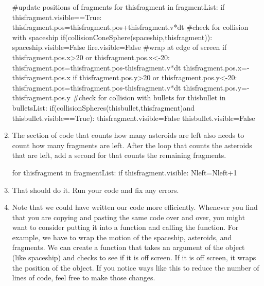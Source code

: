\begin{enumerate}
\begin{myvpython}
    #update positions of fragments
    for thisfragment in fragmentList:
        if thisfragment.visible==True:
            thisfragment.pos=thisfragment.pos+thisfragment.v*dt
            #check for collision with spaceship
            if(collisionConeSphere(spaceship,thisfragment)):
                spaceship.visible=False
                fire.visible=False
            #wrap at edge of screen
            if thisfragment.pos.x>20 or thisfragment.pos.x<-20:
                thisfragment.pos=thisfragment.pos-thisfragment.v*dt
                thisfragment.pos.x=-thisfragment.pos.x
            if thisfragment.pos.y>20 or thisfragment.pos.y<-20:
                thisfragment.pos=thisfragment.pos-thisfragment.v*dt
                thisfragment.pos.y=-thisfragment.pos.y
            #check for collision with bullets
            for thisbullet in bulletsList:
                if(collisionSpheres(thisbullet,thisfragment)and thisbullet.visible==True):
                   thisfragment.visible=False
                   thisbullet.visible=False
\end{myvpython}

\item The section of code that counts how many asteroids are left also needs to count how many fragments are left. After the  loop that counts the asteroids that are left, add a second for  that counts the remaining fragments.

\begin{myvpython}
    for thisfragment in fragmentList:
        if thisfragment.visible:
            Nleft=Nleft+1
\end{myvpython}

\item That should do it. Run your code and fix any errors.

\item Note that we could have written our code more efficiently. Whenever you find that you are copying and pasting the same code over and over, you might want to consider putting it into a function and calling the function. For example, we have to wrap the motion of the spaceship, asteroids, and fragments. We can create a  function that takes an argument of the object (like spaceship) and checks to see if it is off screen. If it is off screen, it wraps the position of the object. If you notice ways like this to reduce the number of lines of code, feel free to make those changes.

\end{enumerate}

